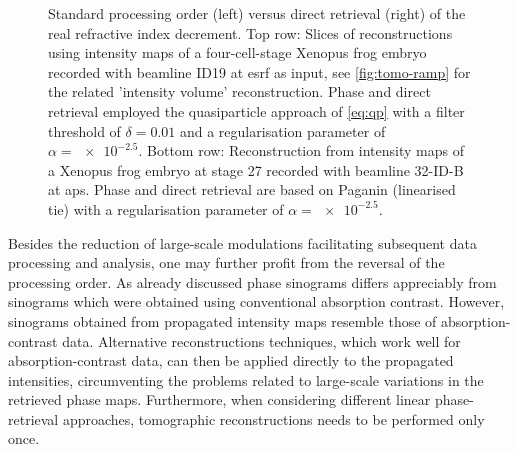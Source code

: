 \documentclass[
twoside,
openright,
titlepage,
numbers=noenddot,
headinclude,
fleqn,
a4paper,
footinclude=true,
cleardoublepage=empty,
abstractoff,
BCOR=5mm,
paper=a4,
fontsize=11pt,
british,ngerman,american,
]{scrreprt}
\begin{document}
\begin{figure}
  \caption[Phase retrieval and subsequent tomographic reconstruction
  vs. tomographic reconstruction of propagated intensity and retrieval
  of real-refractive index increment. ]{Standard processing order
    (left) versus direct retrieval (right) of the real refractive
    index decrement. Top row: Slices of reconstructions using
    intensity maps of a four-cell-stage Xenopus frog embryo recorded
    with beamline ID19 at \ac{esrf} as input, see \cref{fig:tomo-ramp}
    for the related 'intensity volume' reconstruction.  Phase and
    direct retrieval employed the quasiparticle approach of
    \cref{eq:qp} with a filter threshold of $\delta=\num{0.01}$ and a
    regularisation parameter of $\alpha=\num{e-2.5}$.  Bottom row:
    Reconstruction from intensity maps of a Xenopus frog embryo at
    stage 27 recorded with beamline 32-ID-B at \ac{aps}.  Phase and
    direct retrieval are based on Paganin (linearised \ac{tie}) with a
    regularisation parameter of $\alpha=\num{e-2.5}$. }
  \label{fig:tomo-direct}
\end{figure}

Besides the reduction of large-scale modulations facilitating
subsequent data processing and analysis, one may further profit from
the reversal of the processing order.  As already discussed phase
sinograms differs appreciably from sinograms which were obtained using
conventional absorption contrast.  However, sinograms obtained from
propagated intensity maps resemble those of absorption-contrast data.
Alternative reconstructions techniques, which work well for
absorption-contrast data, can then be applied directly to the
propagated intensities, circumventing the problems related to
large-scale variations in the retrieved phase maps.  Furthermore, when
considering different linear phase-retrieval approaches, tomographic
reconstructions needs to be performed only once.
\end{document}
